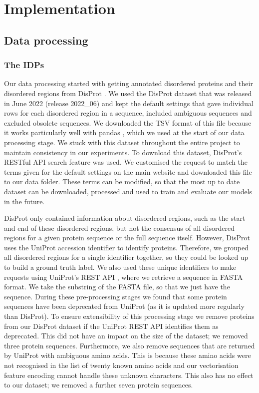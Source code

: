 \documentclass{l4proj}
\begin{document}
\chapter{Implementation}
\label{chap:implementation}

\section{Data processing}

\subsection{The IDPs}

Our data processing started with getting annotated disordered proteins and their disordered regions from DisProt \citep{disprot}. We used the DisProt dataset that was released in June 2022 (release 2022\_06) and kept the default settings that gave individual rows for each disordered region in a sequence, included ambiguous sequences and excluded obsolete sequences. We downloaded the TSV format of this file because it works particularly well with pandas \citep{Mckinney:10}, which we used at the start of our data processing stage. We stuck with this dataset throughout the entire project to maintain consistency in our experiments. To download this dataset, DisProt’s RESTful API search feature \citep{disprot} was used. We customised the request to match the terms given for the default settings on the main website and downloaded this file to our data folder. These terms can be modified, so that the most up to date dataset can be downloaded, processed and used to train and evaluate our models in the future.

DisProt only contained information about disordered regions, such as the start and end of these disordered regions, but not the consensus of all disordered regions for a given protein sequence or the full sequence itself. However, DisProt uses the UniProt accession identifier to identify proteins. Therefore, we grouped all disordered regions for a single identifier together, so they could be looked up to build a ground truth label. We also used these unique identifiers to make requests using UniProt’s REST API \citep{uniprot:22}, where we retrieve a sequence in FASTA format. We take the substring of the FASTA file, so that we just have the sequence. During these pre-processing stages we found that some protein sequences have been deprecated from UniProt (as it is updated more regularly than DisProt). To ensure extensibility of this processing stage we remove proteins from our DisProt dataset if the UniProt REST API identifies them as deprecated. This did not have an impact on the size of the dataset; we removed three protein sequences. Furthermore, we also remove sequences that are returned by UniProt with ambiguous amino acids. This is because these amino acids were not recognised in the list of twenty known amino acids and our vectorisation feature encoding cannot handle these unknown characters. This also has no effect to our dataset; we removed a further seven protein sequences.
\end{document}
